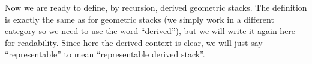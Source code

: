         Now we are ready to define, by recursion, derived geometric stacks. The definition is exactly the same as for geometric stacks (we simply work in a different category so we need to use the word ``derived''), but we will write it again here for readability.
        Since here the derived context is clear, we will just say ``representable'' to mean ``representable derived stack''.
